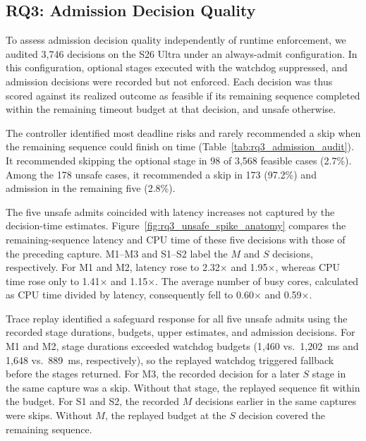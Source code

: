 \subsection{RQ3: Admission Decision Quality}
\label{sec:rq3}




To assess admission decision quality independently of runtime enforcement, we audited 3{,}746 decisions on the S26 Ultra under an always-admit configuration.
In this configuration, optional stages executed with the watchdog suppressed, and admission decisions were recorded but not enforced.
Each decision was thus scored against its realized outcome as feasible if its remaining sequence completed within the remaining timeout budget at that decision, and unsafe otherwise.

The controller identified most deadline risks and rarely recommended a skip when the remaining sequence could finish on time (Table~\ref{tab:rq3_admission_audit}).
It recommended skipping the optional stage in 98 of 3{,}568 feasible cases (2.7\%).
Among the 178 unsafe cases, it recommended a skip in 173 (97.2\%) and admission in the remaining five (2.8\%).

The five unsafe admits coincided with latency increases not captured by the decision-time estimates.
Figure~\ref{fig:rq3_unsafe_spike_anatomy} compares the remaining-sequence latency and CPU time of these five decisions with those of the preceding capture.
M1--M3 and S1--S2 label the \(M\) and \(S\) decisions, respectively.
For M1 and M2, latency rose to 2.32\(\times\) and 1.95\(\times\), whereas CPU time rose only to 1.41\(\times\) and 1.15\(\times\).
The average number of busy cores, calculated as CPU time divided by latency, consequently fell to 0.60\(\times\) and 0.59\(\times\).

Trace replay identified a safeguard response for all five unsafe admits using the recorded stage durations, budgets, upper estimates, and admission decisions.
For M1 and M2, stage durations exceeded watchdog budgets (1{,}460 vs.\ 1{,}202~ms and 1{,}648 vs.\ 889~ms, respectively), so the replayed watchdog triggered fallback before the stages returned.
For M3, the recorded decision for a later \(S\) stage in the same capture was a skip.
Without that stage, the replayed sequence fit within the budget.
For S1 and S2, the recorded \(M\) decisions earlier in the same captures were skips.
Without \(M\), the replayed budget at the \(S\) decision covered the remaining sequence.
